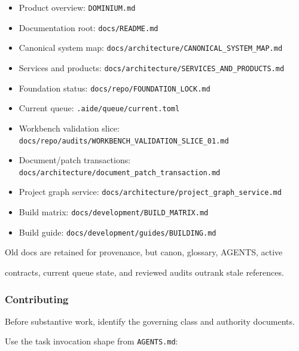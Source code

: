 \documentclass[9pt,a4paper,openany]{book}
\begin{document}
\begin{itemize}
\item Product overview: \texttt{DOMINIUM.\allowbreak{}md}
\item Documentation root: \texttt{docs/\allowbreak{}README.\allowbreak{}md}
\item Canonical system map: \texttt{docs/\allowbreak{}architecture/\allowbreak{}CANONICAL\_\allowbreak{}SYSTEM\_\allowbreak{}MAP.\allowbreak{}md}
\item Services and products: \texttt{docs/\allowbreak{}architecture/\allowbreak{}SERVICES\_\allowbreak{}AND\_\allowbreak{}PRODUCTS.\allowbreak{}md}
\item Foundation status: \texttt{docs/\allowbreak{}repo/\allowbreak{}FOUNDATION\_\allowbreak{}LOCK.\allowbreak{}md}
\item Current queue: \texttt{.\allowbreak{}aide/\allowbreak{}queue/\allowbreak{}current.\allowbreak{}toml}
\item Workbench validation slice: \texttt{docs/\allowbreak{}repo/\allowbreak{}audits/\allowbreak{}WORKBENCH\_\allowbreak{}VALIDATION\_\allowbreak{}SLICE\_\allowbreak{}01.\allowbreak{}md}
\item Document/\allowbreak{}patch transactions: \texttt{docs/\allowbreak{}architecture/\allowbreak{}document\_\allowbreak{}patch\_\allowbreak{}transaction.\allowbreak{}md}
\item Project graph service: \texttt{docs/\allowbreak{}architecture/\allowbreak{}project\_\allowbreak{}graph\_\allowbreak{}service.\allowbreak{}md}
\item Build matrix: \texttt{docs/\allowbreak{}development/\allowbreak{}BUILD\_\allowbreak{}MATRIX.\allowbreak{}md}
\item Build guide: \texttt{docs/\allowbreak{}development/\allowbreak{}guides/\allowbreak{}BUILDING.\allowbreak{}md}
\end{itemize}

Old docs are retained for provenance, but canon, glossary, AGENTS, active

contracts, current queue state, and reviewed audits outrank stale references.\allowbreak{}


\subsubsection{Contributing}

Before substantive work, identify the governing class and authority documents.\allowbreak{}

Use the task invocation shape from \texttt{AGENTS.\allowbreak{}md}:
\end{document}
